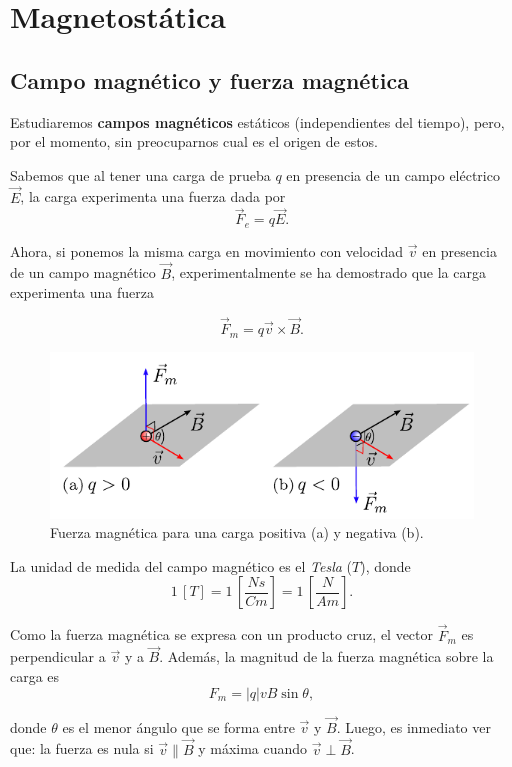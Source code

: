 \chapter{Magnetostática}

\section{Campo magnético y fuerza magnética}

Estudiaremos \textbf{campos magnéticos} estáticos (independientes del tiempo), pero, por el momento, sin preocuparnos cual es el origen de estos. 

Sabemos que al tener una carga de prueba $q$ en presencia de un campo eléctrico $\vec{E}$, la carga experimenta una fuerza dada por
$$\vec{F}_e = q \vec{E}.$$

Ahora, si ponemos la misma carga en movimiento con  velocidad $\vec{v}$ en presencia de un campo magnético $\vec{B}$, experimentalmente se ha demostrado que la carga experimenta una fuerza
\begin{shaded}
$$\vec{F}_m = q\vec{v} \times \vec{B}.$$
\end{shaded}

\begin{figure}[H]
    \centering
    \includegraphics[scale = 1.4]{Figuras/Fuerza-Magnetica.pdf}
    \caption{Fuerza magnética para una carga positiva (a) y negativa (b).}
    \label{fig:Fuerza-Magnetica}
\end{figure}

La unidad de medida del campo magnético es el \textit{Tesla} ($T$), donde
$$1 \,[T] = 1 \, \left[ \frac{N s}{C m } \right] = 1 \,\left[ \frac{N}{A  m } \right].$$

Como la fuerza magnética se expresa con un producto cruz, el vector $\vec{F}_m$ es perpendicular a $\vec{v}$ y a $\vec{B}$. Además, la magnitud de la fuerza magnética sobre la carga es 
$$F_m = |q| vB \sin \theta,$$

donde $\theta$ es el menor ángulo que se forma entre $\vec{v}$ y $\vec{B}$. Luego, es inmediato ver que: la fuerza es nula si $\vec{v} \parallel \vec{B}$ y máxima cuando $\vec{v} \perp \vec{B}$.


